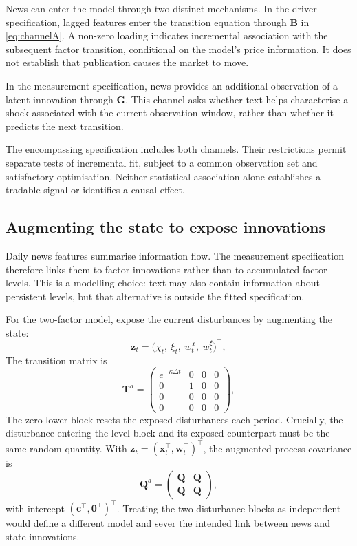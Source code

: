 \documentclass[journal]{IEEEtran}
\begin{document}
News can enter the model through two distinct mechanisms. In the driver specification, lagged features enter the transition equation through $\bm{B}$ in \eqref{eq:channelA}. A non-zero loading indicates incremental association with the subsequent factor transition, conditional on the model's price information. It does not establish that publication causes the market to move.

In the measurement specification, news provides an additional observation of a latent innovation through $\bm{G}$. This channel asks whether text helps characterise a shock associated with the current observation window, rather than whether it predicts the next transition.

The encompassing specification includes both channels. Their restrictions permit separate tests of incremental fit, subject to a common observation set and satisfactory optimisation. Neither statistical association alone establishes a tradable signal or identifies a causal effect.

\subsection{Augmenting the state to expose innovations}
\label{sec:augment}

Daily news features summarise information flow. The measurement specification therefore links them to factor innovations rather than to accumulated factor levels. This is a modelling choice: text may also contain information about persistent levels, but that alternative is outside the fitted specification.

For the two-factor model, expose the current disturbances by augmenting the state:
\begin{equation}
  \bm{z}_t = \bigl(\chi_t,\ \xi_t,\ w^\chi_t,\ w^\xi_t\bigr)^{\!\top} ,
  \label{eq:augstate}
\end{equation}
The transition matrix is
\begin{equation}
  \bm{T}^{a} =
  \begin{pmatrix}
    e^{-\kappa\Delta t} & 0 & 0 & 0 \\
    0 & 1 & 0 & 0 \\
    0 & 0 & 0 & 0 \\
    0 & 0 & 0 & 0
  \end{pmatrix} ,
  \label{eq:augT}
\end{equation}
The zero lower block resets the exposed disturbances each period. Crucially, the disturbance entering the level block and its exposed counterpart must be the same random quantity. With $\bm{z}_t=(\bm{x}_t^{\!\top},\bm{w}_t^{\!\top})^{\!\top}$, the augmented process covariance is
\[
\bm{Q}^{a}=\begin{pmatrix}\bm{Q}&\bm{Q}\\\bm{Q}&\bm{Q}\end{pmatrix},
\]
with intercept $(\bm{c}^{\!\top},\bm{0}^{\!\top})^{\!\top}$. Treating the two disturbance blocks as independent would define a different model and sever the intended link between news and state innovations.
\end{document}
